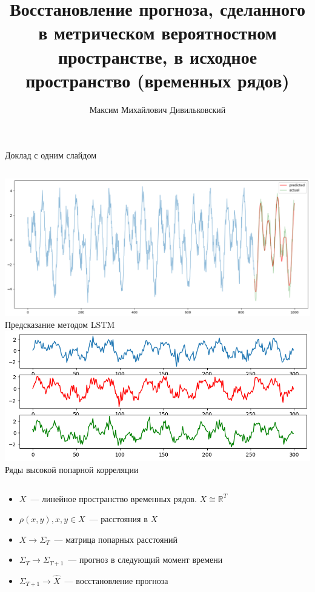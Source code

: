 \documentclass{beamer}
\title[\hbox to 56mm{Восстанвление прогноза}]{Восстановление прогноза, сделанного в метрическом вероятностном пространстве, в исходное пространство (временных рядов)}
\author[М. М. Дивильковский]{Максим Михайлович Дивильковский}
\institute{Московский физико-технический институт}
\date{\footnotesize
	\par\smallskip\emph{Курс:} Автоматизация научных исследований\par (практика, В.\,В.~Стрижов)/Группа 125
	\par\smallskip\emph{Эксперт:} В. В. Стрижов
	\par\smallskip\emph{Консультант:} К. Д. Яковлев
	\par\bigskip\small 2024}
\begin{document}
	\begin{frame}
		\thispagestyle{empty}
		\maketitle
	\end{frame}
	\begin{frame}{Доклад с одним слайдом}
		
		\begin{columns}[c]
			\column{0.5\textwidth}
			\includegraphics[width=1.0\textwidth]{LSTM-prediction}
			Предсказание методом LSTM
			\column{0.5\textwidth}
			\includegraphics[width=1.0\textwidth]{Several-Series}
			Ряды высокой попарной корреляции
		\end{columns}
		
		\bigskip
		\begin{itemize}
			\item $X$~--- линейное пространство временных рядов. $X \cong \mathbb{R}^{T}$
			\item $\rho(x, y), x, y \in X$~--- расстояния в $X$
			\item $X \rightarrow \Sigma_T$~--- матрица попарных расстояний
			\item $\Sigma_T \rightarrow \Sigma_{T+1}$~--- прогноз в следующий момент времени
			\item $\Sigma_{T+1} \rightarrow \hat{X}$~--- {\color{red}восстановление прогноза}
		
		\end{itemize}
	\end{frame}
	
	
\end{document}
